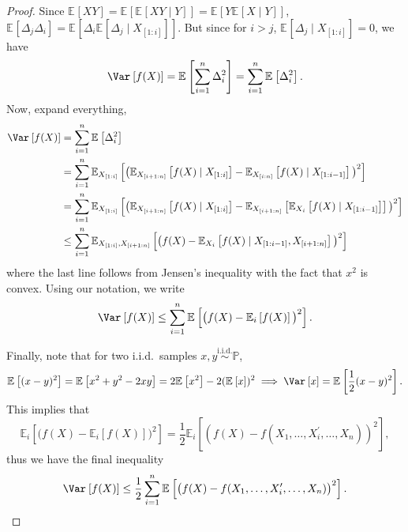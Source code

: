 \begin{proof}
	Since \(\mathbb{E}_{}\left[XY \right] = \mathbb{E}_{}\left[\mathbb{E}_{}\left[XY \mid Y \right] \right] = \mathbb{E}_{}\left[Y \mathbb{E}_{}\left[X \mid Y \right] \right] \), \(\mathbb{E}_{}\left[\Delta _j \Delta _i \right] = \mathbb{E}_{}\left[\Delta _i \mathbb{E}_{}\left[\Delta _j \mid X_{[1:i]} \right] \right] \). But since for \(i > j\), \(\mathbb{E}_{}\left[\Delta _j \mid X_{[1:i]} \right] = 0\), we have
	\[
		\Var_{}\left[f(X) \right] = \mathbb{E}_{}\left[\sum_{i=1}^{n} \Delta _i^2 \right] = \sum_{i=1}^{n} \mathbb{E}_{}\left[\Delta _i^2 \right] .
	\]
	Now, expand everything,
	\[
		\begin{split}
			\Var_{}\left[f(X) \right]
			 & = \sum_{i=1}^{n} \mathbb{E}_{}\left[\Delta _i^2 \right]                                                                                                                                                                    \\
			 & = \sum_{i=1}^{n} \mathbb{E}_{X_{[1:i]}}\left[\big( \mathbb{E}_{X_{[i+1:n]}}\left[f(X) \mid X_{[1:i]} \right] - \mathbb{E}_{X_{[i:n]}}\left[f(X) \mid X_{[1:i-1]} \right] \big)^2 \right]                                   \\
			 & = \sum_{i=1}^{n} \mathbb{E}_{X_{[1:i]}}\left[ \big( \mathbb{E}_{X_{[i+1:n]}}\left[f(X) \mid X_{[1:i]} \right] - \mathbb{E}_{X_{[i+1:n]}}\left[ \mathbb{E}_{X_i}\left[f(X) \mid X_{[1:i-1]} \right] \right] \big)^2 \right] \\
			 & \leq \sum_{i=1}^{n} \mathbb{E}_{X_{[1:i]}, X_{[i+1:n]}}\left[\big( f(X) - \mathbb{E}_{X_i}\left[f(X) \mid X_{[1:i-1]}, X_{[i+1:n]} \right] \big)^2 \right]
		\end{split}
	\]
	where the last line follows from Jensen's inequality with the fact that \(x^2\) is convex. Using our notation, we write
	\[
		\Var_{}\left[f(X) \right] \leq \sum_{i=1}^{n} \mathbb{E}_{}\left[\big(f(X) - \mathbb{E}_{i}\left[f(X) \right] \big)^2\right] .
	\]

	Finally, note that for two i.i.d.\ samples \(x, y \overset{\text{i.i.d.} }{\sim } \mathbb{P} \),
	\[
		\mathbb{E}_{}\left[(x-y)^2 \right] = \mathbb{E}_{}\left[x^2 + y^2 - 2xy \right] = 2 \mathbb{E}_{}\left[x^2 \right] - 2(\mathbb{E}_{}\left[x \right] )^2
		\implies \Var_{}\left[x \right] = \mathbb{E}_{}\left[\frac{1}{2}(x-y)^2 \right].
	\]
	This implies that
	\[
		\mathbb{E}_{i}\left[\big(f(X) - \mathbb{E}_{i}\left[f(X) \right] \big)^2 \right]
		= \frac{1}{2} \mathbb{E}_{i}\left[(f(X) - f(X_1, \dots , X_i^{\prime} , \dots , X_n))^2 \right] ,
	\]
	thus we have the final inequality
	\[
		\Var_{}\left[f(X) \right]
		\leq \frac{1}{2}\sum_{i=1}^{n} \mathbb{E}_{}\left[\big( f(X) - f(X_1, \dots , X_i^{\prime} , \dots , X_n) \big)^2 \right].
	\]
\end{proof}

